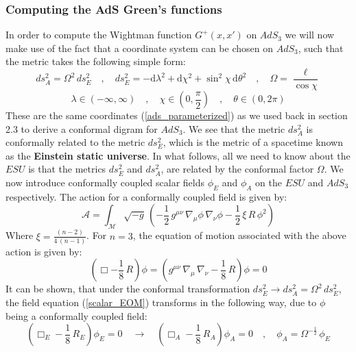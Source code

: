 \subsubsection{Computing the AdS Green's functions}
In order to compute the Wightman function $G^+(x, x')$ on $AdS_3$ we will now make use of the fact that a coordinate system can be chosen on $AdS_3$, such that the metric takes the following simple form:
%
%
\begin{equation}\label{AdS3_ESU}
ds^2_A = \Omega^2 \, ds^2_E
\quad , \quad
ds^2_E =
- \mathrm{d}\lambda^2
+ \mathrm{d}\chi^2
+ \sin^2\chi \, \mathrm{d}\theta^2
\quad , \quad
\Omega = \frac{\ell}{\cos\chi}
\end{equation}
%
\begin{equation*}
\lambda \in (-\infty, \infty)
\quad , \quad
\chi \in \left( 0, \frac{\pi}{2} \right)
\quad , \quad
\theta \in (0, 2 \pi)
\end{equation*}
%
%
These are the same coordinates (\ref{ads_parameterized}) as we used back in section 2.3 to derive a conformal digram for $AdS_3$. We see that the metric $ds^2_A$ is conformally related to the metric $ds^2_E$, which is the metric of a spacetime known as the \textbf{Einstein static universe}. In what follows, all we need to know about the $ESU$ is that the metrics $ds^2_E$ and $ds^2_A$, are related by the conformal factor $\Omega$. We now introduce conformally coupled scalar fields $\phi_E$ and $\phi_A$ on the $ESU$ and $AdS_3$ respectively. The action for a conformally coupled field is given by:
%
%
\begin{equation}\label{conf_action}
\mathcal{A} = \int_{\mathcal{M}} \sqrt{-g} \, \left(
- \frac{1}{2} \, g^{\mu\nu} \, \nabla_{\mu} \phi \, \nabla_{\nu} \phi
- \frac{1}{2} \, \xi \, R \, \phi^2
\right)
\end{equation}
%
%
Where $\xi = \frac{(n - 2)}{4 \, (n - 1)}$. For $n=3$, the equation of motion associated with the above action is given by:
%
%
\begin{equation}\label{scalar_EOM}
\left( \Box - \frac{1}{8} \, R \right) \phi
= \left( g^{\mu \nu} \, \nabla_{\mu} \, \nabla_{\nu} - \frac{1}{8} \, R \right) \phi
= 0
\end{equation}
%
%
It can be shown, that under the conformal transformation $ds^2_E \to ds^2_A = \Omega^2 \, ds^2_E$, the field equation (\ref{scalar_EOM}) transforms in the following way, due to $\phi$ being a conformally coupled field:
%
%
\begin{equation}\label{conf_relation}
\left( \Box_E - \frac{1}{8} \, R_E \right) \phi_E = 0
\quad \to \quad
\left( \Box_A - \frac{1}{8} \, R_A \right) \phi_A = 0
\quad , \quad
\phi_A = \Omega^{-\frac{1}{2}} \, \phi_E
\end{equation}
